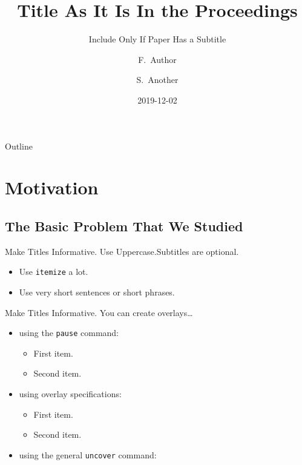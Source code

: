 \documentclass{beamer}
\title[Short Paper Title]
{Title As It Is In the Proceedings}
\subtitle
{Include Only If Paper Has a Subtitle}
\author[Author, Another] %
{F.~Author\inst{1} \and S.~Another\inst{2}}
\institute[Universities of Somewhere and Elsewhere] %
{
  \inst{1}%
  University of Somewhere
  \qquad
  \inst{2}%
  University of Elsewhere}
\date[CFP 2003] %
{2019-12-02}
\begin{document}
\frame[plain, t]{\titlepage}

\begin{frame}{Outline}
  \tableofcontents
\end{frame}

\section{Motivation}

\subsection{The Basic Problem That We Studied}

\begin{frame}{Make Titles Informative. Use Uppercase.}{Subtitles are optional.}
  \begin{itemize}
  \item
    Use \texttt{itemize} a lot.
  \item
    Use very short sentences or short phrases.
  \end{itemize}
\end{frame}

\begin{frame}{Make Titles Informative.}
  You can create overlays\dots
  \begin{itemize}
  \item using the \texttt{pause} command:
    \begin{itemize}
    \item
      First item.
      \pause
    \item
      Second item.
    \end{itemize}
  \item
    using overlay specifications:
    \begin{itemize}
    \item<3->
      First item.
    \item<4->
      Second item.
    \end{itemize}
  \item
    using the general \texttt{uncover} command:
    \begin{itemize}
    \end{itemize}
  \end{itemize}
\end{frame}
\end{document}
